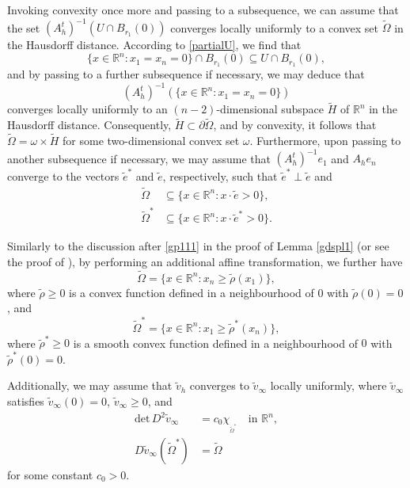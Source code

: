 \documentclass[11pt]{amsart}
\theoremstyle{plain}
\renewcommand{\det}{\mbox{det}}
\newcommand{\0}{\textbf{0}}
\numberwithin{equation}{section}
\numberwithin{equation}{section}
\numberwithin{figure}{section}
\begin{document}
Invoking convexity once more and passing to a subsequence, we can assume that the set \((A_h^t)^{-1}(U \cap B_{r_1}(0))\) converges locally uniformly to a convex set \(\tilde{\Omega}\) in the Hausdorff distance. According to \eqref{partialU}, we find that
\[
\{x \in \mathbb{R}^n : x_1 = x_n = 0\} \cap B_{r_1}(0) \subseteq U \cap B_{r_1}(0),
\]
and by passing to a further subsequence if necessary, we may deduce that $$(A_h^t)^{-1}\left(\{x \in \mathbb{R}^n : x_1 = x_n = 0\}\right)$$ converges locally uniformly to an \((n-2)\)-dimensional subspace \(\tilde{H}\) of \(\mathbb{R}^n\) in the Hausdorff distance.
Consequently, \(\tilde{H} \subset \partial \tilde{\Omega}\), and by convexity, it follows that
\(\tilde{\Omega} = \omega \times \tilde{H}\) for some two-dimensional convex set \(\omega\).
Furthermore, upon passing to another subsequence if necessary, we may assume that \((A_h^t)^{-1}e_1\) and \(A_he_n\) converge to the vectors \(\tilde{e}^*\) and \(\tilde{e}\), respectively, such that \(\tilde{e}^* \perp \tilde{e}\) and
\begin{align*}
\tilde{\Omega} &\subseteq \{x\in\mathbb{R}^n : x \cdot \tilde{e} > 0\}, \\
\tilde{\Omega}^* &\subseteq \{x\in\mathbb{R}^n : x \cdot \tilde{e}^* > 0\}.
\end{align*} 


Similarly to the discussion after \eqref{gp111} in the proof of Lemma \ref{gdspl1} (or see the proof of \cite[Lemma 5.19]{CLW3}),  by performing an additional affine transformation, we further have 
\begin{equation}
\tilde{\Omega} = \{x \in \mathbb{R}^n : x_n \geq \tilde{\rho}(x_1)\}, 
\end{equation}
where \(\tilde\rho \geq 0\) is a convex function defined in a neighbourhood of \(0\) with \(\tilde\rho(0) = 0\), and
\begin{equation}
\tilde{\Omega}^* = \{x \in \mathbb{R}^n : x_1 \geq \tilde{\rho}^*(x_n)\},
\end{equation}
where \(\tilde\rho^* \geq 0\) is a smooth convex function defined in a neighbourhood of \(0\) with \(\tilde\rho^*(0) = 0\).

Additionally, we may assume that \(\tilde v_h\) converges to \(\tilde v_\infty\) locally uniformly, where \(\tilde v_\infty\) satisfies \(\tilde v_\infty(0) = 0\), \(\tilde v_\infty \geq 0\), and
\begin{equation}\label{maulim}
\begin{aligned}
\det\, D^2 \tilde v_\infty &= c_0 \chi_{_{\tilde{\Omega}^*}} \quad \text{in } \mathbb{R}^n, \\
D\tilde v_\infty(\tilde{\Omega}^*) &= \tilde{\Omega}
\end{aligned}
\end{equation}
for some constant \(c_0 > 0\).
\end{document}
